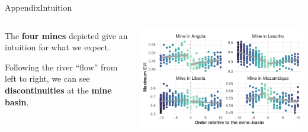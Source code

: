 \documentclass[aspectratio=169,11pt,dvipsnames, handout]{beamer}
\begin{document}
\begin{frame}{\textcolor{defaultclr!30}{Appendix}\hspace{0.75em}Intuition}
\label{frame:intu}
\begin{columns}
    \begin{column}{0.4\textwidth}
        The \textbf{four mines} depicted give an intuition for what we expect.

        \vspace{1em}

        Following the river “flow” from left to right, we can see \textbf{discontinuities} at the \textbf{mine basin}.
    \end{column}

    \begin{column}{0.55\textwidth}
        \centering
        \includegraphics[width=\linewidth]{img/mine-basin_ord-discont.pdf}
        \hyperlink{frame:appintu}{} 
    \end{column}
\end{columns}

\end{frame}

\end{document}
